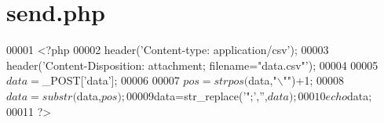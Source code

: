 \hypertarget{send_8php_source}{\section{send.\-php}
}

\begin{DoxyCode}
00001 <?php
00002 header(\textcolor{stringliteral}{'Content-type: application/csv'});
00003 header(\textcolor{stringliteral}{'Content-Disposition: attachment; filename="data.csv"'});
00004 
00005 $data=$\_POST[\textcolor{stringliteral}{'data'}];
00006 
00007 $pos=strpos($data,\textcolor{stringliteral}{"\(\backslash\)""})+1;
00008 $data=substr($data,$pos);
00009 $data=str\_replace(\textcolor{stringliteral}{'";'},\textcolor{stringliteral}{''},$data);
00010 echo $data;
00011 ?>
\end{DoxyCode}
